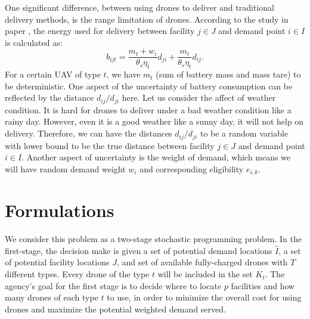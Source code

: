 \documentclass[preprint,review,11pt,authoryear]{elsarticle}
\begin{document}
One significant difference, between using drones to deliver and traditional delivery methods, is the range limitation of drones. According to the study in paper \cite{figliozzi2017lifecycle}, the energy used for delivery between facility $j \in J$ and demand point $i \in I$ is calculated as:
\begin{equation} 
    b_{ijt} = {\frac{m_t + w_i}{\theta_s \eta_t}} d_{ji} + {\frac{m_t}{ \theta_s \eta_t }} d_{ij}. \label{formula:battery_consumption}
\end{equation}
For a certain UAV of type $t$, we have $m_t$ (sum of battery mass and mass tare) to be deterministic. One aspect of the uncertainty of battery consumption can be reflected by the distance $d_{ij} \slash d_{ji}$ here. Let us consider the affect of weather condition. It is hard for drones to deliver under a bad weather condition like a rainy day. However, even it is a good weather like a sunny day, it will not help on delivery. Therefore, we can have the distances $d_{ij} \slash d_{ji}$ to be a random variable with lower bound to be the true distance between facility $j \in J$ and demand point $i \in I$. Another aspect of uncertainty is the weight of demand, which means we will have random demand weight $w_i$ and corresponding eligibility $e_{i,k}$.

\section{Formulations}\label{sec:formulation}
We consider this problem as a two-stage stochastic programming problem. In the first-stage, the decision make is given a set of potential demand locations $\hat{I}$, a set of potential facility locations $J$, and set of available fully-charged drones with $T$ different types. Every drone of the type $t$ will be included in the set $K_t$. The agency's goal for the first stage is to decide where to locate $p$ facilities and how many drones of each type $t$ to use, in order to minimize the overall cost for using drones and maximize the potential weighted demand served. 
\end{document}
